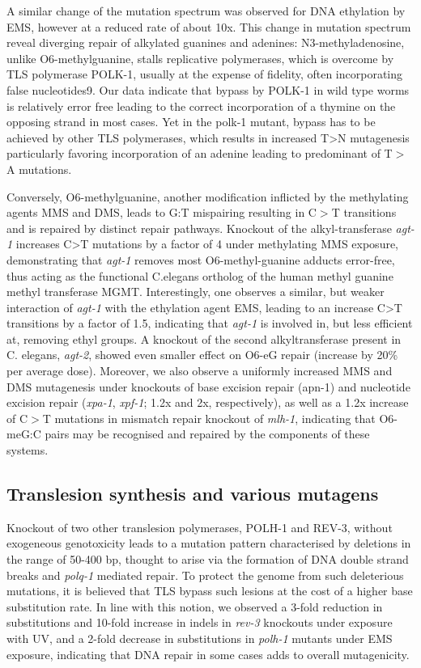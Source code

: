 A similar change of the mutation spectrum was observed for DNA ethylation by EMS, however at a reduced rate of about 10x. This change in mutation spectrum reveal diverging repair of alkylated guanines and adenines: N3-methyladenosine, unlike O6-methylguanine, stalls replicative polymerases, which is overcome by TLS polymerase POLK-1, usually at the expense of fidelity, often incorporating false nucleotides9. Our data indicate that bypass by POLK-1 in wild type worms is relatively error free leading to the correct incorporation of a thymine on the opposing strand in most cases. Yet in the polk-1 mutant, bypass has to be achieved by other TLS polymerases, which results in increased T>N mutagenesis particularly favoring incorporation of an adenine leading to predominant of T$>$A mutations. 

Conversely, O6-methylguanine, another modification inflicted by the methylating agents MMS and DMS, leads to G:T mispairing resulting in C$>$T transitions and is repaired by distinct repair pathways. Knockout of the alkyl-transferase \textit{agt-1} increases C>T mutations by a factor of 4 under methylating MMS exposure, demonstrating that \textit{agt-1} removes most O6-methyl-guanine adducts error-free, thus acting as the functional C.elegans ortholog of the human methyl guanine methyl transferase MGMT. Interestingly, one observes a similar, but weaker interaction of \textit{agt-1} with the ethylation agent EMS, leading to an increase C>T transitions by a factor of 1.5, indicating that \textit{agt-1} is involved in, but less efficient at, removing ethyl groups. A knockout of the second alkyltransferase present in C. elegans, \textit{agt-2}, showed even smaller effect on O6-eG repair (increase by 20\% per average dose). Moreover, we also observe a uniformly increased MMS and DMS mutagenesis under knockouts of base excision repair (apn-1) and nucleotide excision repair (\textit{xpa-1}, \textit{xpf-1}; 1.2x and 2x, respectively), as well as a 1.2x increase of C$>$T mutations in mismatch repair knockout of \textit{mlh-1}, indicating that O6-meG:C pairs may be recognised and repaired by the components of these systems.

\subsection{Translesion synthesis and various mutagens}

Knockout of two other translesion polymerases, POLH-1 and REV-3, without exogeneous genotoxicity leads to a mutation pattern characterised by deletions in the range of 50-400 bp, thought to arise via the formation of DNA double strand breaks and \textit{polq-1} mediated repair. To protect the genome from such deleterious mutations, it is believed that TLS bypass such lesions at the cost of a higher base substitution rate. In line with this notion, we observed a 3-fold reduction in substitutions and 10-fold increase in indels in \textit{rev-3} knockouts under exposure with UV, and a 2-fold decrease in substitutions in \textit{polh-1} mutants under EMS exposure, indicating that DNA repair in some cases adds to overall mutagenicity.

